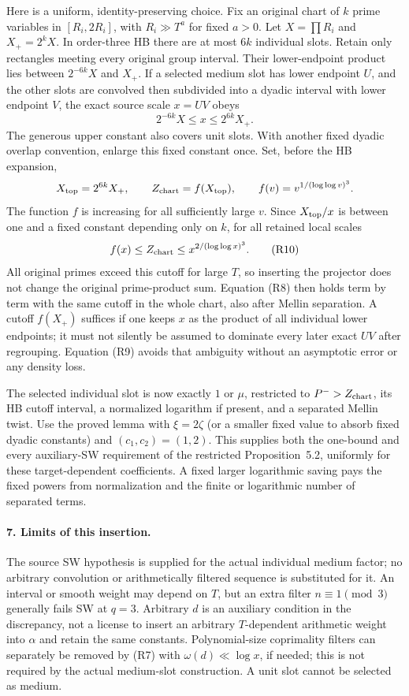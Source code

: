 Here is a uniform, identity-preserving choice. Fix an original chart
of $k$ prime variables in $[R_i,2R_i]$, with
$R_i\gg T^a$ for fixed $a>0$. Let $X=\prod R_i$ and
$X_+=2^kX$. In order-three HB there are at most $6k$ individual slots.
Retain only rectangles meeting every original group interval. Their
lower-endpoint product lies between $2^{-6k}X$ and $X_+$.
If a selected medium slot has lower endpoint $U$, and the other slots
are convolved then subdivided into a dyadic interval with lower endpoint
$V$, the exact source scale $x=UV$ obeys
\[
 2^{-6k}X\le x\le 2^{6k}X_+.                              \tag{R9}
\]
The generous upper constant also covers unit slots. With another fixed
dyadic overlap convention, enlarge this fixed constant once.
Set, before the HB expansion,
\[
 X_{\rm top}=2^{6k}X_+,\qquad
 Z_{\rm chart}=f(X_{\rm top}),\qquad
 f(v)=v^{1/(\log\log v)^3}.
\]
The function $f$ is increasing for all sufficiently large $v$. Since
$X_{\rm top}/x$ is between one and a fixed constant depending only on
$k$, for all retained local scales
\[
 f(x)\le Z_{\rm chart}\le x^{2/(\log\log x)^3}.            \tag{R10}
\]
All original primes exceed this cutoff for large $T$, so inserting
the projector does not change the original prime-product sum.
Equation (R8) then holds term by term with the same cutoff in the
whole chart, also after Mellin separation. A cutoff $f(X_+)$ suffices
if one keeps $x$ as the product of all individual lower endpoints;
it must not silently be assumed to dominate every later exact $UV$
after regrouping. Equation (R9) avoids that ambiguity without an
asymptotic error or any density loss.

The selected individual slot is now exactly $1$ or $\mu$, restricted
to $P^->Z_{\rm chart}$, its HB cutoff interval, a normalized logarithm
if present, and a separated Mellin twist. Use the proved lemma with
$\xi=2\zeta$ (or a smaller fixed value to absorb fixed dyadic constants)
and $(c_1,c_2)=(1,2)$. This supplies both the one-bound and every
auxiliary-SW requirement of the restricted Proposition~5.2,
uniformly for these target-dependent coefficients. A fixed larger
logarithmic saving pays the fixed powers from normalization and the
finite or logarithmic number of separated terms.

\paragraph{7. Limits of this insertion.}
The source SW hypothesis is supplied for the actual individual medium
factor; no arbitrary convolution or arithmetically filtered sequence
is substituted for it. An interval or smooth weight may depend on
$T$, but an extra filter $n\equiv1\pmod3$ generally fails SW at
$q=3$. Arbitrary $d$ is an auxiliary condition in the discrepancy,
not a license to insert an arbitrary $T$-dependent arithmetic weight
into $\alpha$ and retain the same constants. Polynomial-size
coprimality filters can separately be removed by (R7) with
$\omega(d)\ll\log x$, if needed; this is not required by the actual
medium-slot construction. A unit slot cannot be selected as medium.

